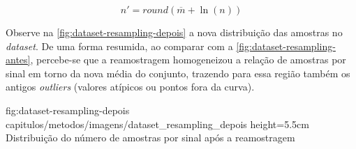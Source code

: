 \begin{equation}
    \label{eqn:resampling-target}
    n' = round( \overline{m} + \ln(n) )
\end{equation}


Observe na \autoref{fig:dataset-resampling-depois} a nova distribuição das amostras no \textit{dataset}. De uma forma resumida, ao comparar com a \autoref{fig:dataset-resampling-antes}, percebe-se que a reamostragem homogeneizou a relação de amostras por sinal em torno da nova média do conjunto, trazendo para essa região também os antigos \textit{outliers} (valores atípicos ou pontos fora da curva).


\figura
{fig:dataset-resampling-depois} %
{capitulos/metodos/imagens/dataset_resampling_depois} %
{height=5.5cm} %
{Distribuição do número de amostras por sinal após a reamostragem} %
{} %





